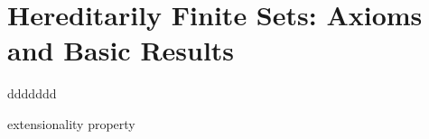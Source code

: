 \section{Hereditarily Finite Sets: Axioms and Basic Results}
ddddddd

\begin{theorem}

    extensionality property

\end{theorem}